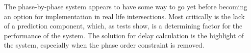 The phase-by-phase system appears to have some way to go yet before becoming an option for implementation in real life intersections. Most critically is the lack of a prediction component, which, as tests show, is a determining factor for the performance of the system. 
The solution for delay calculation is the highlight of the system, especially when the phase order constraint is removed.